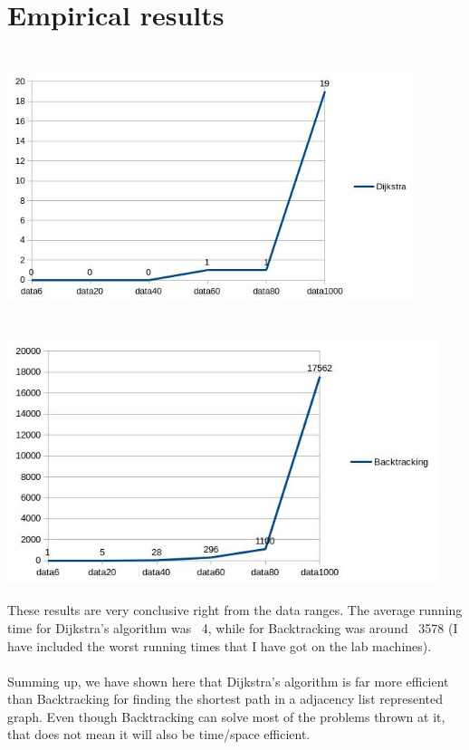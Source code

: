 \documentclass{article}
\begin{document}
\section*{Empirical results}

\includegraphics[width=450px,height=300px]{Dijkstra.jpg} \\
\includegraphics[width=475px,height=300px]{Backtracking.jpg} \\

These results are very conclusive right from the data ranges. The
average running time for Dijkstra's algorithm was ~4, while for
Backtracking was around ~3578 (I have included the worst running
times that I have got on the lab machines). \\ \\ 

Summing up, we have shown here that Dijkstra's algorithm is far more
efficient than Backtracking for finding the shortest path in a
adjacency list represented graph. Even though Backtracking can solve
most of the problems thrown at it, that does not mean it will also be
time/space efficient.
\end{document}
